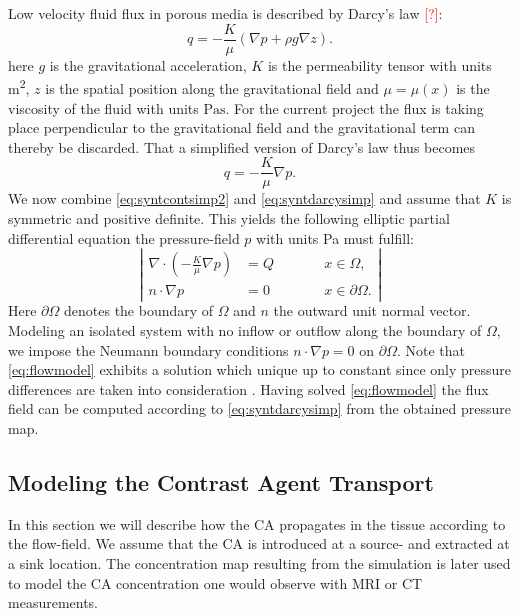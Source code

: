 \documentclass[paper=a4, fontsize=11pt,parskip=half,headings=small]{scrartcl}
\newcommand{\missingsource}{\textcolor{red}{[?]}}
\begin{document}
	Low velocity fluid flux in porous media is described by Darcy's law \missingsource:
	\[
		q = -\frac{K}{\mu} \left( \nabla p + \rho g  \nabla z \right).
	\]
	here $g$ is the gravitational acceleration, $K$ is the permeability tensor with units \si{\square\meter}, $z$ is the spatial position along the gravitational field and $\mu = \mu(x)$ is the viscosity of the fluid with units $\si{\pascal\second}$.
	For the current project the flux is taking place perpendicular to the gravitational field and the gravitational term can thereby be discarded.
	That a simplified version of Darcy's law thus becomes
	\begin{equation}
		q = -\frac{K}{\mu} \nabla p.
		\label{eq:syntdarcysimp}
	\end{equation}
	We now combine \eqref{eq:syntcontsimp2} and \eqref{eq:syntdarcysimp} and assume that $K$ is symmetric and positive definite.
	This yields the following elliptic partial differential equation the pressure-field $p$ with units \si{\pascal} must fulfill:
	\begin{equation}
		\left\vert
		\begin{alignedat}{2}
			\nabla \cdot \left( -\frac{K}{\mu} \nabla p \right) &= Q  \qquad &&x \in \Omega, \\
			n \cdot \nabla p &=0 &&x \in \partial \Omega.
		\end{alignedat}
		\right\vert
		\label{eq:flowmodel}
	\end{equation}
	Here $\partial \Omega$ denotes the boundary of $\Omega$ and $n$ the outward unit normal vector. 
	Modeling an isolated system with no inflow or outflow along the boundary of $\Omega$, we impose the Neumann boundary conditions $n \cdot \nabla p = 0$ on $\partial \Omega$.
	Note that \eqref{eq:flowmodel} exhibits a solution which unique up to constant since only pressure differences are taken into consideration \cite{evans98}.
	Having solved \eqref{eq:flowmodel} the flux field can be computed according to \eqref{eq:syntdarcysimp} from the obtained pressure map. 
	
	
	\subsection{Modeling the Contrast Agent Transport}\label{sec:transport}
	In this section we will describe how the CA propagates in the tissue according to the flow-field.
	We assume that the CA is introduced at a source- and extracted at a sink location.
	The concentration map resulting from the simulation is later used to model the CA concentration one would observe with MRI or CT measurements.
	
\end{document}
